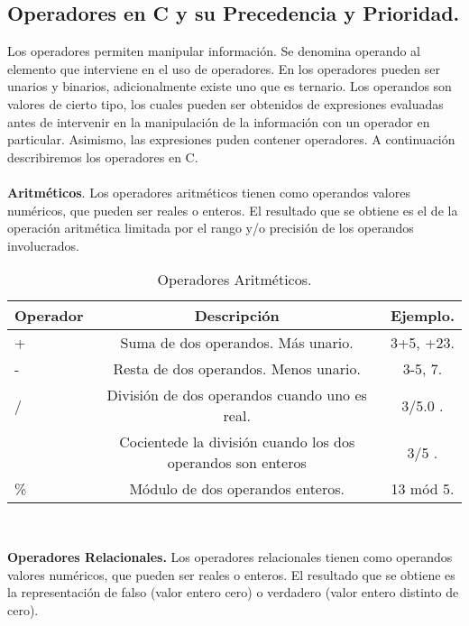 \subsection{Operadores en C y su Precedencia y Prioridad.} 
Los operadores permiten manipular información. Se denomina operando al elemento que interviene en el uso de operadores. En los operadores pueden ser unarios y binarios, adicionalmente existe uno que es ternario. Los operandos son valores de cierto tipo, los cuales pueden ser obtenidos de expresiones evaluadas antes de intervenir en la manipulación de la información con un operador en particular. Asimismo, las expresiones puden contener operadores. A continuación describiremos los operadores en C.\\
\\
\textbf{Aritméticos}.
Los operadores aritméticos tienen como operandos valores numéricos, que pueden ser reales o enteros. El resultado que se obtiene es el de la operación aritmética limitada por el rango y/o precisión de los operandos involucrados.
\\
\begin{table}[H]
	\centering
 \begin{tabular}{l | c | c }
\hline
Operador & Descripción & Ejemplo. \\ \hline
+ & Suma de dos operandos. Más unario. & 3+5, +23. \\ \hline
- & Resta de dos operandos. Menos unario. & 3-5, 7. \\ \hline
/ & División de dos operandos cuando uno es real. &  3/5.0 .\\
  & Cocientede la división cuando los dos operandos son enteros & 3/5 .\\ \hline
\% & Módulo de dos operandos enteros. &  13 mód 5. \\
\hline
\end{tabular}
\\
\caption{\label{tab:Operadores Aritméticos} Operadores Aritméticos.}
\end{table} 
\textbf{Operadores Relacionales.}
Los operadores relacionales tienen como operandos valores numéricos, que pueden ser reales o enteros. El resultado que se obtiene es la representación de falso (valor entero cero) o verdadero (valor entero distinto de cero).
